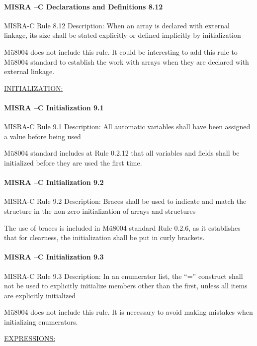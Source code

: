 \paragraph{MISRA –C Declarations and Definitions 8.12}
MISRA-C Rule 8.12 Description: When an array is declared with external linkage, its size shall be stated explicitly or defined implicitly by initialization 

Mü8004 does not include this rule. It could be interesting to add this rule to Mü8004 standard to establish the work with arrays when they are declared with external linkage.


\begin{center}
\textsc{\underline{INITIALIZATION:}}
\end{center}

\paragraph{MISRA –C Initialization 9.1}
MISRA-C Rule 9.1 Description: All automatic variables shall have been assigned a value before being used 

Mü8004 standard includes at Rule 0.2.12 that all variables and fields shall be initialized before they are used the first time.

\paragraph{MISRA –C Initialization 9.2}
MISRA-C Rule 9.2 Description: Braces shall be used to indicate and match the structure in the non-zero initialization of arrays and structures

The use of braces is included in Mü8004 standard Rule 0.2.6, as it establishes that for clearness, the initialization shall be put in curly brackets.

\paragraph{MISRA –C Initialization 9.3}
MISRA-C Rule 9.3 Description: In an enumerator list, the “=” construct shall not be used to explicitly initialize members other than the first, unless all items are explicitly initialized

Mü8004 does not include this rule. It is necessary to avoid making mistakes when initializing enumerators.


\begin{center}
\textsc{\underline{EXPRESSIONS:}}
\end{center}

